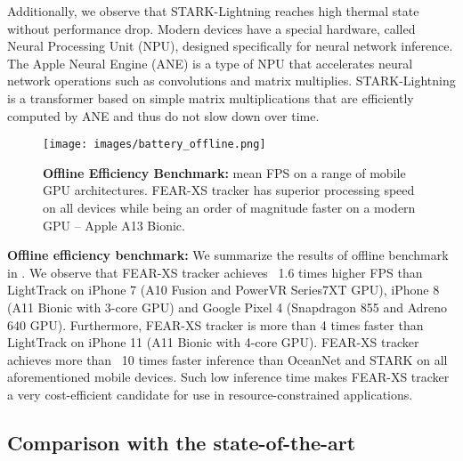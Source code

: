 \documentclass[runningheads]{llncs}
\begin{document}
Additionally, we observe that STARK-Lightning reaches high thermal state without performance drop. Modern devices have a special hardware, called Neural Processing Unit (NPU), designed specifically for neural network inference. The Apple Neural Engine (ANE) is a type of NPU that accelerates neural network operations such as convolutions and matrix multiplies. STARK-Lightning is a transformer based on simple matrix multiplications that are efficiently computed by ANE and thus do not slow down over time.

\begin{figure}[t!]\centering
  \texttt{[image: images/battery\_offline.png]}
\caption{\textbf{Offline Efficiency Benchmark:} mean FPS on a range of mobile GPU architectures. FEAR-XS tracker has superior processing speed on all devices while being an order of magnitude faster on a modern GPU -- Apple A13 Bionic. 
}
  \label{fig:battery-offline}
\end{figure}

\textbf{Offline efficiency benchmark:} We summarize the results of offline benchmark in . 
We observe that FEAR-XS tracker achieves ~1.6 times higher FPS than LightTrack \cite{LightTrack} on iPhone 7 (A10 Fusion and PowerVR Series7XT GPU), iPhone 8 (A11 Bionic with 3-core GPU) and Google Pixel 4 (Snapdragon 855 and Adreno 640 GPU). 
Furthermore, FEAR-XS tracker is more than 4 times faster than LightTrack on iPhone 11 (A11 Bionic with 4-core GPU). 
FEAR-XS tracker achieves more than ~10 times faster inference than OceanNet \cite{Ocean} and STARK \cite{STARK} on all aforementioned mobile devices. 
Such low inference time makes FEAR-XS tracker a very cost-efficient candidate for use in resource-constrained applications.






\subsection{Comparison with the state-of-the-art}
\end{document}
